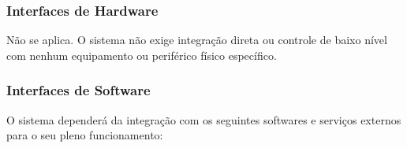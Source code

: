 ﻿\documentclass[12pt,a4paper]{article}
\begin{document}
\subsubsection{Interfaces de Hardware}
\label{sec:InterfaceHardware}

Não se aplica. O sistema não exige integração direta ou controle de baixo nível com nenhum equipamento ou periférico físico específico.

\subsubsection{Interfaces de Software}
\label{sec:InterfaceSoftware}

O sistema dependerá da integração com os seguintes softwares e serviços externos para o seu pleno funcionamento:
\end{document}
